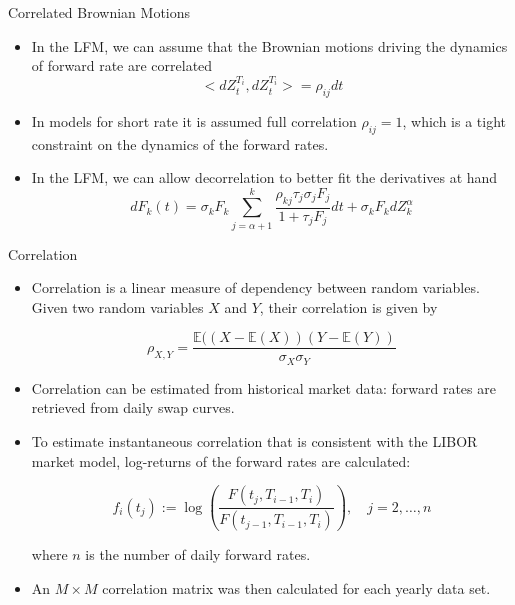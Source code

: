 \documentclass{beamer}
\begin{document}
\begin{frame}{Correlated Brownian Motions}
	\begin{itemize}
		\item In the LFM, we can assume that the Brownian motions driving the dynamics of forward rate are correlated
		\begin{equation}
			<dZ_t^{T_i}, dZ_t^{T_i}> = \rho_{ij}dt
		\end{equation}
		\item In models for short rate it is assumed full correlation $\rho_{ij}=1$, which is a tight constraint on the dynamics of the forward rates.
		\item In the LFM, we can allow decorrelation to better fit the derivatives at hand
		\begin{equation*}
			dF_k(t) = \sigma_kF_k\sum_{j=\alpha+1}^k\frac{\boxed{\rho_{kj}}\tau_j\sigma_jF_j}{1+\tau_jF_j}dt+\sigma_kF_k dZ^\alpha_k
		\end{equation*}
	\end{itemize}
\end{frame}

\begin{frame}{Correlation}
\begin{itemize}
\item Correlation is a linear measure of dependency between random variables. Given two random variables $X$ and $Y$, their correlation is given by

\begin{equation*}
	\rho_{X,Y} = \frac{\mathbb{E}((X-\mathbb{E}(X))(Y-\mathbb{E}(Y))}{\sigma_X \sigma_Y}
\end{equation*}

\item Correlation can be estimated from historical market data: forward rates are retrieved from daily swap curves.
\item To estimate instantaneous correlation that is consistent with the LIBOR market model, log-returns of the forward rates are calculated:

\begin{equation*}
	f_i(t_j) := \log\left(\frac{F(t_j, T_{i-1}, T_i)}{F(t_{j-1}, T_{i-1}, T_i)}\right), \quad j=2,\ldots,n
\end{equation*}

where $n$ is the number of daily forward rates. %
\item  An $M \times M$ correlation matrix was then calculated for each yearly data set.
\end{itemize}
\end{frame}
\end{document}
